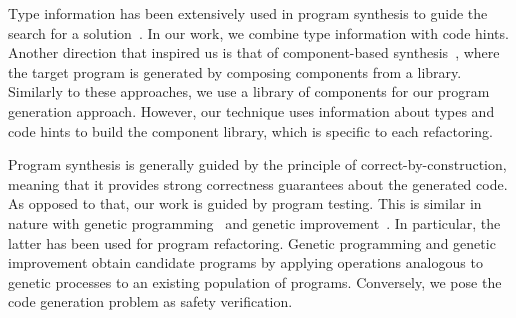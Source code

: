 \documentclass[sigconf,review,anonymous]{acmart}
\begin{document}
Type information has been extensively used in program synthesis to
guide the search for a solution~\cite{DBLP:conf/sfp/Katayama05,DBLP:conf/pldi/FeserCD15,DBLP:conf/pldi/OseraZ15,DBLP:journals/pacmpl/LubinCOC20,DBLP:journals/pacmpl/YamaguchiMDW21}.
In our work, we combine type information with code hints.
%
Another direction that inspired us is that of component-based synthesis~\cite{DBLP:conf/icse/JhaGST10,DBLP:conf/pldi/GulwaniJTV11,DBLP:conf/popl/FengM0DR17}, where the target program is generated by composing components from a library. Similarly
to these approaches, we use a library of components for our program
generation approach. However, our technique uses information about types
and code hints to build the component library, which is specific to each refactoring.






Program synthesis is generally guided by the principle of correct-by-construction, meaning that it provides strong correctness guarantees about the generated code.
As opposed to that, our work is guided by program testing. This is similar in nature with genetic programming~\cite{Koza92} and genetic improvement~\cite{DBLP:journals/dagstuhl-reports/PetkeGFL18,7911210}. In particular, the latter has been used for program refactoring. Genetic programming and genetic improvement obtain candidate programs by applying operations analogous to genetic processes to an existing population of programs. Conversely, we pose the code generation problem as safety verification.
%
%
\end{document}
